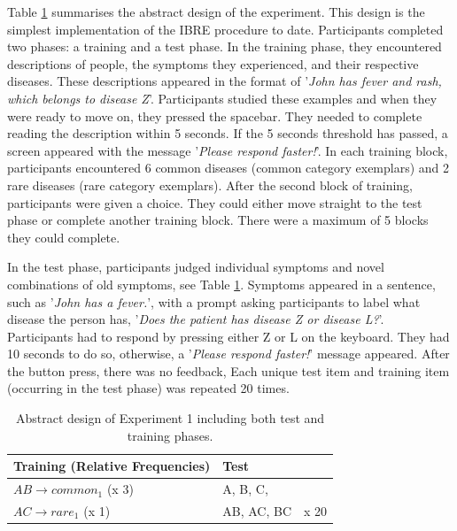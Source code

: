 \documentclass[10pt,letterpaper]{article}
\begin{document}
Table \ref{tab:abstract-exp1} summarises the abstract design of the experiment.
This design is the simplest implementation of the IBRE procedure to date.
Participants completed two phases: a training and a test phase.
In the training phase, they encountered descriptions of people, the symptoms they experienced, and their respective diseases.
These descriptions appeared in the format of '\textit{John has fever and rash, which belongs to disease Z}'.
Participants studied these examples and when they were ready to move on, they pressed the spacebar.
They needed to complete reading the description within 5 seconds.
If the 5 seconds threshold has passed, a screen appeared with the message '\textit{Please respond faster!}'.
In each training block, participants encountered 6 common diseases (common category exemplars) and 2 rare diseases (rare category exemplars).
After the second block of training, participants were given a choice.
They could either move straight to the test phase or complete another training block.
There were a maximum of 5 blocks they could complete.

In the test phase, participants judged individual symptoms and novel combinations of old symptoms, see Table \ref*{tab:abstract-exp1}.
Symptoms appeared in a sentence, such as '\textit{John has a fever.}', with a prompt asking participants to label what disease the person has, '\textit{Does the patient has disease Z or disease L?}'.
Participants had to respond by pressing either Z or L on the keyboard.
They had 10 seconds to do so, otherwise, a '\textit{Please respond faster!}' message appeared.
After the button press, there was no feedback,
Each unique test item and training item (occurring in the test phase) was repeated 20 times.

\begin{table}[!ht]
  \begin{center}
    \caption{Abstract design of Experiment 1 including both test and training phases. \\}
    \label{tab:abstract-exp1}
    \begin{tabular}{llr} %
      \textbf{Training (Relative Frequencies)} & \textbf{Test}& \\
      \hline
      $AB \to common_{1}$ (x 3) &  A, B, C,         &  \\
      $AC \to rare_{1}$   (x 1) &  AB, AC, BC      & x 20 \\
      \hline
    \end{tabular}
  \end{center}
\end{table}
\end{document}
